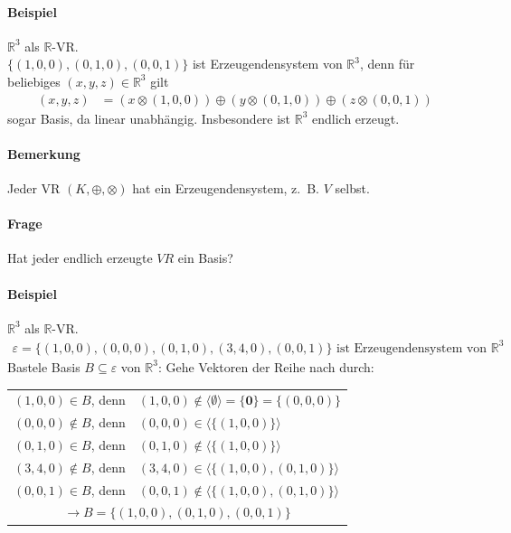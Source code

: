 \documentclass[a5paper, 10pt]{book}
\newcommand{\inR}{\in\mathbb{R}}
\newcommand{\circleplus}{\oplus}%
\newcommand{\circlecdot}{\otimes}%
\newcommand{\boldzero}{\mathbf{0}}
\begin{document}
				\paragraph{Beispiel}
					$\mathbb{R}^3$ als $\mathbb{R}$-VR.\\
					$\{(1,0,0),(0,1,0),(0,0,1)\}$ ist Erzeugendensystem von $\mathbb{R}^3$, denn für beliebiges $(x,y,z)\inR^3$ gilt
					\begin{align}
						(x,y,z) &= (x \circlecdot (1,0,0)) \circleplus (y\circlecdot(0,1,0)) \circleplus (z\circlecdot(0,0,1))
					\end{align}
					sogar Basis, da linear unabhängig. Insbesondere ist $\mathbb{R}^3$ endlich erzeugt.
					
				\paragraph{Bemerkung}
					Jeder VR $(K,\circleplus,\circlecdot)$ hat ein Erzeugendensystem, z.~B. $V$ selbst.
				\paragraph{Frage}
					Hat jeder endlich erzeugte $VR$ ein Basis?
				\paragraph{Beispiel}
					$\mathbb{R}^3$ als $\mathbb{R}$-VR.
					\begin{align}
						\varepsilon = \{ (1,0,0), (0,0,0), (0,1,0), (3,4,0), (0,0,1) \} \text{ ist Erzeugendensystem von } \mathbb{R}^3
					\end{align}
					Bastele Basis $B \subseteq \varepsilon$ von $\mathbb{R}^3$: Gehe Vektoren der Reihe nach durch:
					\begin{longtable}{rl}
						$(1,0,0) \in B$, denn	& $(1,0,0) \notin \langle \emptyset \rangle = \{\boldzero\} = \{(0,0,0)\}$\\
						$(0,0,0) \notin B$, denn& $(0,0,0) \in \langle \{ (1,0,0) \} \rangle$ \\
						$(0,1,0) \in B$, denn	& $(0,1,0) \notin \langle \{ (1,0,0) \} \rangle$ \\
						$(3,4,0) \notin B$, denn& $(3,4,0) \in \langle \{ (1,0,0), (0,1,0) \} \rangle$ \\
						$(0,0,1) \in B$, denn	& $(0,0,1) \notin \langle \{ (1,0,0), (0,1,0) \} \rangle$ \\
						\multicolumn{2}{c}{$\rightarrow B = \{ (1,0,0), (0,1,0), (0,0,1) \}$}
					\end{longtable}
				
\end{document}
